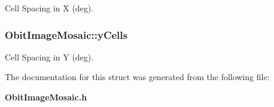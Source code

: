 Cell Spacing in X (deg). 

\subsubsection{ {\bf Obit\-Image\-Mosaic::y\-Cells}}\label{structObitImageMosaic_o14}


Cell Spacing in Y (deg). 



The documentation for this struct was generated from the following file:\begin{CompactItemize}
\item 
{\bf Obit\-Image\-Mosaic.h}\end{CompactItemize}
